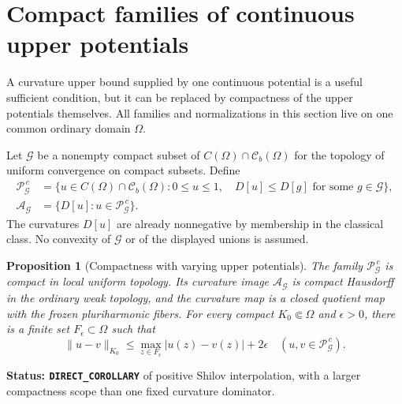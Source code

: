 \documentclass[11pt,a4paper]{article}
\numberwithin{equation}{section}
\newtheorem{proposition}[theorem]{Proposition}
\theoremstyle{definition}
\theoremstyle{remark}
\begin{document}


\section{Compact families of continuous upper potentials}
\label{sec:r6-compact-dominator-families}

A curvature upper bound supplied by one continuous potential is a useful
sufficient condition, but it can be replaced by compactness of the upper
potentials themselves.
All families and normalizations in this section live on one common
ordinary domain $\Omega$.

Let $\mathscr G$ be a nonempty compact subset of
$C(\Omega)\cap\mathcal C_b(\Omega)$ for the topology of uniform
convergence on compact subsets. Define
\begin{align*}
 \mathscr P_{\mathscr G}^{\,c}
  &=\{u\in C(\Omega)\cap\mathcal C_b(\Omega):0\le u\le1,
                   \quad D[u]\le D[g]\text{ for some }g\in\mathscr G\},\\
 \mathscr A_{\mathscr G}&=\{D[u]:u\in\mathscr P_{\mathscr G}^{\,c}\}.
\end{align*}
The curvatures $D[u]$ are already nonnegative by membership in the
classical class. No convexity of $\mathscr G$ or of the displayed
unions is assumed.

\begin{proposition}[Compactness with varying upper potentials]
\label{prop:r6-compact-upper-potential-family}
The family $\mathscr P_{\mathscr G}^{\,c}$ is compact in local
uniform topology. Its curvature image $\mathscr A_{\mathscr G}$
is compact Hausdorff in the ordinary weak topology, and the curvature
map is a closed quotient map with the frozen pluriharmonic fibers.
For every compact $K_0\Subset\Omega$ and $\epsilon>0$, there is
a finite set $F_\epsilon\subset\Omega$ such that
\[
 \|u-v\|_{K_0}
     \le\max_{z\in F_\epsilon}|u(z)-v(z)|+2\epsilon
             \quad(u,v\in\mathscr P_{\mathscr G}^{\,c}).
\]
\end{proposition}

\noindent\textbf{Status: \texttt{DIRECT\_COROLLARY}} of positive
Shilov interpolation, with a larger compactness scope than one fixed
curvature dominator.
\end{document}
